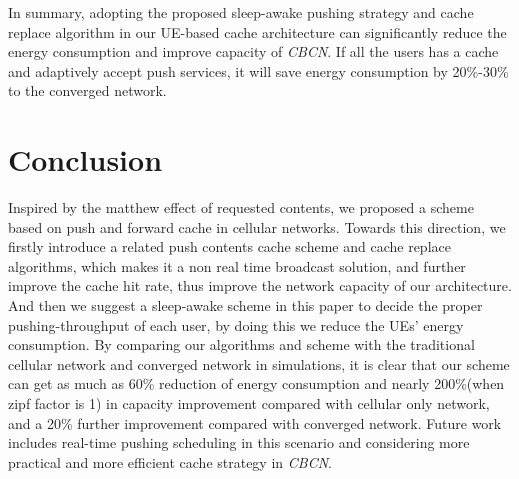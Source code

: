 \documentclass[conference]{IEEEtran}
\begin{document}
In summary, adopting the proposed sleep-awake pushing strategy and cache replace algorithm in our UE-based cache architecture can significantly reduce the energy consumption and improve capacity of \emph{CBCN}. If all the users has a cache and adaptively accept push services, it will save energy consumption by 20\%-30\% to the converged network. 

\section{Conclusion}
Inspired by the matthew effect of requested contents, we proposed a scheme based on push and forward cache in cellular networks. Towards this direction, we firstly introduce a related push contents cache scheme and cache replace algorithms, which makes it a non real time broadcast solution, and further improve the cache hit rate, thus improve the network capacity of our architecture. And then we suggest a sleep-awake scheme in this paper to decide the proper pushing-throughput of each user, by doing this we reduce the UEs' energy consumption. By comparing our algorithms and scheme with the traditional cellular network and converged network in simulations, it is clear that our scheme can get as much as 60\% reduction of energy consumption and nearly 200\%(when zipf factor is 1) in capacity improvement compared with cellular only network, and a 20\% further improvement compared with converged network. Future work includes real-time pushing scheduling in this scenario and considering more practical and more efficient cache strategy in \emph{CBCN}.


%
%
%




\end{document}
